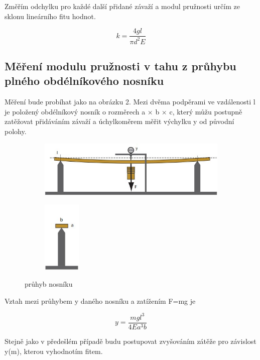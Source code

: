 \documentclass[a4paper,11pt]{article}
\begin{document}
Změřím odchylku pro každé další přidané závaží a modul pružnosti určím ze sklonu lineárního fitu hodnot.

\begin{equation}
  k = \frac{4 g l}{\pi d^2 E}
\end{equation}

\subsection{Měření modulu pružnosti v tahu z průhybu plného obdélníkového nosníku}

Měření bude probíhat jako na obrázku 2. Mezi dvěma podpěrami ve vzdálenosti l je položený obdélníkový nosník o rozměrech a $\times$ b $\times$ c, který můžu postupně zatěžovat přidáváním závaží a úchylkoměrem měřit výchylku y od původní polohy.

\begin{figure}[htpb]
  \centering
  \begin{subfigure}[b]{0.65\textwidth}
    \includegraphics[width=\textwidth]{nosnik_pred.jpg}
  \end{subfigure}
  \begin{subfigure}[b]{70pt}
    \includegraphics[width=51pt]{nosnik_bok.jpg}
  \end{subfigure}
  \caption{průhyb nosníku}
\end{figure}

Vztah mezi průhybem y daného nosníku a zatížením F=mg je

\begin{equation}
y = \frac{m g l^{3}}{4 E a^{3} b}
\end{equation}

Stejně jako v předešlém případě budu postupovat zvyšováním zátěže pro závislost y(m), kterou vyhodnotím fitem.
\end{document}
